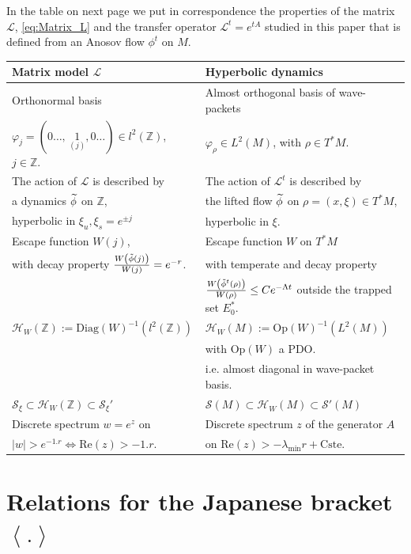 \documentclass[AHL,Unicode,longabstracts,published]{cedram}
\newcommand{\clS}{\mathcal{S}}
\newcommand{\clH}{\mathcal{H}}
\newcommand{\clL}{\mathcal{L}}
\newcommand{\Ree}{\mathrm{Re}}
\newcommand{\Cste}{\mathrm{Cste}}
\newcommand{\Diag}{\mathrm{Diag}}
\newcommand{\Opp}{\mathrm{Op}}
\newcommand{\bbZ}{\mathbb{Z}}
\let\oldtilde\tilde
\renewcommand*{\tilde}[1]{\mathchoice{\widetilde{#1}}{\widetilde{#1}}{\oldtilde{#1}}{\oldtilde{#1}}}
\newcommand{\Ree}{\mathrm{Re}}
\newcommand{\clH}{\mathcal{H}}
\begin{document}
In the table on next page we put in correspondence the properties of the matrix $\clL$, \eqref{eq:Matrix_L} and the transfer operator $\clL^{t}=e^{tA}$ studied in this paper that is defined from an Anosov flow $\phi^{t}$ on $M$.
\begin{table}
\centering
\begin{tabular}{|l|l|}
\hline Matrix model $\clL$ & Hyperbolic dynamics\tabularnewline
\hline
\hline Orthonormal basis & Almost orthogonal basis of wave-packets\tabularnewline $\varphi_{j}=\left(0\ldots,\,\underset{(j)}{1},0\ldots\right)\in l^{2}\left(\bbZ\right)$, $j\in\bbZ$. & {$\varphi_{\rho}\in L^{2}\left(M\right)$, }with $\rho\in T^{*}M$.\tabularnewline
\hline The action of $\clL$ is described by & The action of $\clL^{t}$ is described by\tabularnewline a dynamics $\tilde{\phi}$ on $\bbZ$, & the lifted flow $\tilde{\phi}$ on $\rho=\left(x,\xi\right)\in T^{*}M$,\tabularnewline hyperbolic in $\xi_{u},\xi_{s}=e^{\pm j}$ & hyperbolic in $\xi$.\tabularnewline
\hline Escape function $W\left(j\right)$, & Escape function $W$ on $T^{*}M$\tabularnewline with decay property $\frac{W\left(\tilde{\phi}\left(j\right)\right)}{W\left(j\right)}=e^{-r}$. & with temperate and decay property\tabularnewline & $\frac{W\left(\tilde{\phi}^{t}\left(\rho\right)\right)}{W\left(\rho\right)}\leq Ce^{-\Lambda t}$ outside the trapped set $E_{0}^{*}$.\tabularnewline
\hline $\clH _{W}\left(\bbZ\right):=\Diag\left(W\right)^{-1}\left(l^{2}\left(\bbZ\right)\right)$ & $\clH _{W}\left(M\right):=\Opp \left(W\right)^{-1}\left(L^{2}\left(M\right)\right)$\tabularnewline & with $\Opp \left(W\right)$ a PDO.\tabularnewline & i.e. almost diagonal in wave-packet basis.\tabularnewline
\hline $\clS_{\xi}\subset\clH _{W}\left(\bbZ\right)\subset\clS_{\xi}'$ & $\clS\left(M\right)\subset\clH _{W}\left(M\right)\subset\clS'\left(M\right)$\tabularnewline
\hline Discrete spectrum $w=e^{z}$ on & Discrete spectrum $z$ of the generator $A$\tabularnewline $\left|w\right|>e^{-1.r}\Leftrightarrow\Ree\left(z\right)>-1.r$. & on $\Ree\left(z\right)>-\lambda_{\min}r+\Cste$.\tabularnewline
\hline
\end{tabular}
\end{table}

\section{Relations for the Japanese bracket \texorpdfstring{$\left\langle.\right\rangle $}{<.> }}
\end{document}
